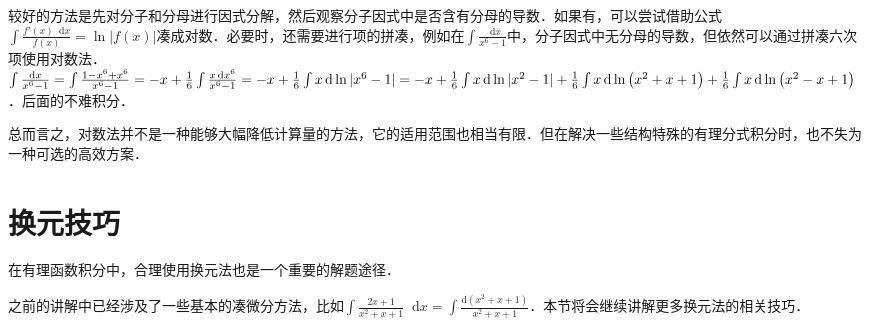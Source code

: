 \documentclass{ctexbook}
\newcommand*{\dif}{\mathop{}\!\mathrm{d}}
\begin{document}
较好的方法是先对分子和分母进行因式分解，然后观察分子因式中是否含有分母的导数．如果有，可以尝试借助公式$\int\frac{f'\left(x\right)\dif{x}}{f\left(x\right)}=\ln{|f\left(x\right)|}$凑成对数．必要时，还需要进行项的拼凑，例如在$\int\frac{\dif{x}}{x^{6}-1}$中，分子因式中无分母的导数，但依然可以通过拼凑六次项使用对数法．\\
$\int\frac{\dif{x}}{x^{6}-1}=\int\frac{1-x^{6}+x^{6}}{x^{6}-1}=-x+\frac{1}{6}\int\frac{x\dif{x}^{6}}{x^{6}-1}=-x+\frac{1}{6}\int x\,\mathrm{d}\ln{|x^{6}-1|}=-x+\frac{1}{6}\int x\,\mathrm{d}\ln{|x^{2}-1|}\\+\frac{1}{6}\int x\,\mathrm{d}\ln{\left(x^{2}+x+1\right)}+\frac{1}{6}\int x\,\mathrm{d}\ln{\left(x^{2}-x+1\right)}$．后面的不难积分．\par
总而言之，对数法并不是一种能够大幅降低计算量的方法，它的适用范围也相当有限．但在解决一些结构特殊的有理分式积分时，也不失为一种可选的高效方案．\par
\section{换元技巧}
在有理函数积分中，合理使用换元法也是一个重要的解题途径．\par
之前的讲解中已经涉及了一些基本的凑微分方法，比如$\int\frac{2x+1}{x^{2}+x+1}\dif{x}=\int\frac{\mathrm{d}\left(x^{2}+x+1\right)}{x^{2}+x+1}$．本节将会继续讲解更多换元法的相关技巧．\par
\end{document}
